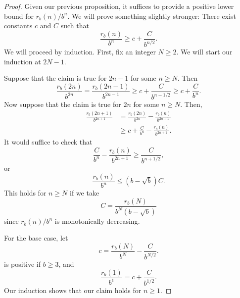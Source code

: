 \documentclass[12pt]{amsart}
\theoremstyle{definition}
\begin{document}
\begin{proof}
    Given our previous proposition, it suffices to provide a positive lower
    bound for $r_b(n) / b^n$. We will prove something slightly stronger: There
    exist constants $c$ and $C$ such that
    \begin{equation*}
        \frac{r_b(n)}{b^n} \geq c + \frac{C}{b^{n / 2}}.
    \end{equation*}
    We will proceed by induction. First, fix an integer $N \geq 2$. We will
    start our induction at $2N - 1$.

    Suppose that the claim is true for $2n - 1$ for some $n \geq N$. Then
    \begin{equation*}
        \frac{r_b(2n)}{b^{2n}} = \frac{r_b(2n - 1)}{b^{2n - 1}}
                               \geq c + \frac{C}{b^{n - 1 / 2}}
                               \geq c + \frac{C}{b^n}.
    \end{equation*}
    Now suppose that the claim is true for $2n$ for some $n \geq N$. Then,
    \begin{align*}
        \frac{r_b(2n + 1)}{b^{2n + 1}} &= \frac{r_b(2n)}{b^{2n}} - \frac{r_b(n)}{b^{2n + 1}} \\
                                       &\geq c + \frac{C}{b^n} - \frac{r_b(n)}{b^{2n + 1}}.
    \end{align*}
    It would suffice to check that
    \begin{equation*}
        \frac{C}{b^n} - \frac{r_b(n)}{b^{2n + 1}} \geq \frac{C}{b^{n + 1/2}},
    \end{equation*}
    or
    \begin{equation*}
        \frac{r_b(n)}{b^n} \leq (b - \sqrt{b}) C.
    \end{equation*}
    This holds for $n \geq N$ if we take
    \begin{equation*}
        C = \frac{r_b(N)}{b^N (b - \sqrt{b})}
    \end{equation*}
    since $r_b(n) / b^n$ is monotonically decreasing.

    For the base case, let
    \begin{equation*}
        c = \frac{r_b(N)}{b^N} - \frac{C}{b^{N / 2}}.
    \end{equation*}
    is positive if $b \geq 3$, and
    \begin{equation*}
        \frac{r_b(1)}{b^1} = c + \frac{C}{b^{1/2}}.
    \end{equation*}
    Our induction shows that our claim holds for $n \geq 1$.
\end{proof}
\end{document}
